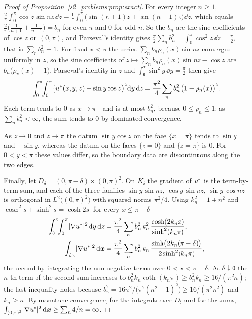 \begin{proof}[Proof of Proposition~\ref{s2_problems:prop:exact}]
For every integer $n\ge1$,
$\tfrac2\pi\int_0^\pi\cos z\,\sin nz\,\dd z
=\tfrac1\pi\int_0^\pi\bigl(\sin(n+1)z+\sin(n-1)z\bigr)\dd z$,
which equals $\tfrac2\pi\bigl(\tfrac1{n+1}+\tfrac1{n-1}\bigr)=b_n$ for even $n$ and $0$ for
odd $n$. So the $b_n$ are the sine coefficients of $\cos z$ on $(0,\pi)$, and Parseval's
identity gives $\tfrac\pi2\sum_nb_n^2=\int_0^\pi\cos^2z\,\dd z=\tfrac\pi2$, that is
$\sum_nb_n^2=1$. For fixed $x<\pi$ the series $\sum_nb_n\rho_n(x)\sin nz$ converges
uniformly in $z$, so the sine coefficients of
$z\mapsto\sum_nb_n\rho_n(x)\sin nz-\cos z$ are $b_n\bigl(\rho_n(x)-1\bigr)$. Parseval's
identity in $z$ and $\int_0^\pi\sin^2y\,\dd y=\tfrac\pi2$ then give
\[
\int_0^\pi\!\!\int_0^\pi\bigl(u^{*}(x,y,z)-\sin y\cos z\bigr)^2\mathrm{d} y\,\mathrm{d} z
=\frac{\pi^2}{4}\sum_{n}b_n^2\,\bigl(1-\rho_n(x)\bigr)^2 .
\]
Each term tends to $0$ as $x\to\pi^-$ and is at most $b_n^2$, because $0\le\rho_n\le1$; as
$\sum_nb_n^2<\infty$, the sum tends to $0$ by dominated convergence.

As $z\to0$ and $z\to\pi$ the datum $\sin y\cos z$ on the face $\{x=\pi\}$ tends to
$\sin y$ and $-\sin y$, whereas the datum on the faces $\{z=0\}$ and $\{z=\pi\}$ is $0$.
For $0<y<\pi$ these values differ, so the boundary data are discontinuous along the two
edges.

Finally, let $D_\delta=(0,\pi-\delta)\times(0,\pi)^2$. On $K_\delta$ the gradient of $u^{*}$
is the term-by-term sum, and each of the three families $\sin y\,\sin nz$,
$\cos y\,\sin nz$, $\sin y\,\cos nz$ is orthogonal in $L^2\bigl((0,\pi)^2\bigr)$ with
squared norms $\pi^2/4$. Using $k_n^2=1+n^2$ and $\cosh^2s+\sinh^2s=\cosh2s$, for every
$x\le\pi-\delta$
\begin{align*}
\int_0^\pi\!\!\int_0^\pi\lvert \nabla u^{*}\rvert^2\,\mathrm{d} y\,\mathrm{d} z
&=\frac{\pi^2}{4}\sum_{n}b_n^2\,k_n^2\,\frac{\cosh(2k_nx)}{\sinh^2(k_n\pi)},\\
\int_{D_\delta}\lvert \nabla u^{*}\rvert^2\,\mathrm{d}\boldsymbol{x}
&=\frac{\pi^2}{4}\sum_{n}b_n^2\,k_n\,\frac{\sinh\bigl(2k_n(\pi-\delta)\bigr)}{2\sinh^2(k_n\pi)},
\end{align*}
the second by integrating the non-negative terms over $0<x<\pi-\delta$. As
$\delta\downarrow0$ the $n$-th term of the second sum increases to
$b_n^2k_n\coth(k_n\pi)\ge b_n^2k_n\ge16/(\pi^2n)$; the last inequality holds because
$b_n^2=16n^2/\bigl(\pi^2(n^2-1)^2\bigr)\ge16/(\pi^2n^2)$ and $k_n\ge n$. By monotone
convergence, for the integrals over $D_\delta$ and for the sums,
$\int_{(0,\pi)^3}\lvert \nabla u^{*}\rvert^2\,\mathrm{d}\boldsymbol{x}\ge\sum_{n}4/n=\infty$.
\end{proof}

